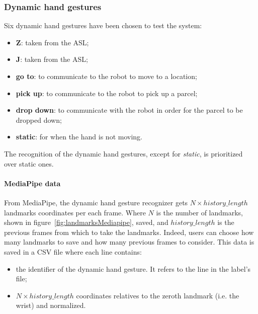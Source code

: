 \documentclass[../thesis.tex]{subfiles}
\begin{document}
\subsubsection{Dynamic hand gestures}
Six dynamic hand gestures have been chosen to test the system:
\begin{itemize}
    \item \textbf{Z}: taken from the \acrshort{ASL};
    \item \textbf{J}: taken from the \acrshort{ASL};
    \item \textbf{go to}: to communicate to the robot to move to a location;
    \item \textbf{pick up}: to communicate to the robot to pick up a parcel;
    \item \textbf{drop down}: to communicate with the robot in order for the parcel to be dropped down;
    \item \textbf{static}: for when the hand is not moving.
\end{itemize}
The recognition of the dynamic hand gestures, except for \textit{static}, is prioritized over static ones.
\paragraph{MediaPipe data}
From MediaPipe, the dynamic hand gesture recognizer gets $N \times history\_length$ landmarks coordinates per each frame. Where $N$ is the number of landmarks, shown in figure~\ref{fig:landmarksMediapipe}, saved, and $history\_length$ is the previous frames from which to take the landmarks. Indeed, users can choose how many landmarks to save and how many previous frames to consider. This data is saved in a CSV file where each line contains: 
\begin{itemize}
    \item the identifier of the dynamic hand gesture. It refers to the line in the label’s file; 
    \item $N \times history\_length$ coordinates relatives to the zeroth landmark (i.e. the wrist) and normalized.
\end{itemize}
\end{document}
